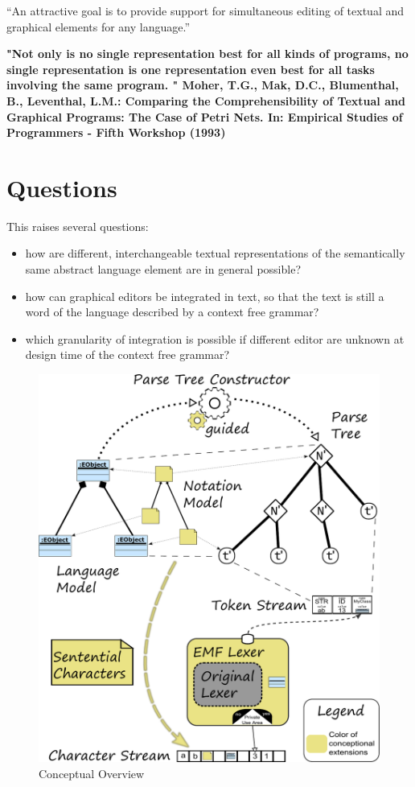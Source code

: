 ``An attractive goal is to provide support for simultaneous editing of textual and graphical elements for any language.''\cite{EMP}

\textbf{
"Not only is no single representation best for all kinds of programs, no single representation is one representation even best for all tasks involving the same  program. " Moher, T.G., Mak, D.C., Blumenthal, B., Leventhal, L.M.: Comparing the Comprehensibility of Textual and Graphical Programs: The Case of Petri Nets. In: Empirical Studies of Programmers - Fifth Workshop (1993)}


\section{Questions}
This raises several questions:
\begin{itemize}
	\item how are different, interchangeable textual representations of the semantically same abstract language element are in general possible?
	\item how can graphical editors be integrated in text, so that the text is still a word of the language described by a context free grammar?
	\item which granularity of integration is possible if different editor are unknown at design time of the context free grammar?
\end{itemize}

\begin{figure}
\centering
\includegraphics[scale=0.75]{gfx/ex/Concept} 
\caption{Conceptual Overview}
\label{ConceptFigure}
\end{figure}

